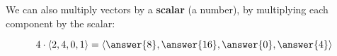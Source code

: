 \documentclass{ximera}
\renewcommand{\vec}[1]{{\overset{\boldsymbol{\rightharpoonup}}{\mathbf{#1}}}}
\renewcommand{\vector}[1]{\left\langle #1\right\rangle}
\begin{document}
\begin{question}
\begin{feedback}[correct]
\begin{image}
      \end{image}
  \end{feedback}
\end{question}



We can also multiply vectors by a \textbf{scalar} (a number), by
multiplying each component by the scalar:

\begin{question}
  \[
  4\cdot \vector{2 , 4 , 0 , 1} = \vector{\answer{8}, \answer{16} , \answer{0} , \answer{4}}
  \]	
\end{question}
\end{document}
